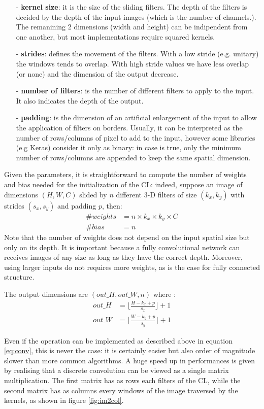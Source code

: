 \documentclass[12pt,a4paper]{report}
\begin{document}
\begin{itemize}
 \setlength\itemsep{-0.2em}
 \item [-] {\bf kernel size}: it is the size of the sliding filters. The depth of the filters is decided by the depth of the input images (which is the number of channels.). The remanining 2 dimensions (width and height) can be indipendent from one another, but most implementations require squared kernels.
 \item [-] {\bf strides}: defines the movement of the filters. With a low stride (e.g. unitary) the windows tends to overlap. With high stride values we have less overlap (or none) and the dimension of the output decrease.
 \item [-] {\bf number of filters}: is the number of different filters to apply to the input. It also indicates the depth of the output.
 \item [-] {\bf padding}: is the dimension of an artificial enlargement of the input to allow the application of filters on borders. Usually, it can be interpreted as the number of rows/columns of pixel to add to the input, however some libraries (e.g Keras) consider it only as binary: in case is true, only the minimum number of rows/columns are appended to keep the same spatial dimension.
\end{itemize}
Given the parameters, it is straightforward to compute the number of weights and bias needed for the initialization of the CL: indeed, suppose an image of dimensions $(H, W, C)$ slided by $n$ different 3-D filters of size $(k_x, k_y)$ with strides $(s_x, s_y)$ and padding $p$, then:
\begin{align}
 \# weights &= n \times k_x \times k_y \times C \\
 \# bias &= n
\end{align}
Note that the number of weights does not depend on the input spatial size but only on its depth. It is important because a fully convolutional network can receives images of any size as long as they have the correct depth. Moreover, using larger inputs do not requires more weights, as is the case for fully connected structure. 

The output dimensions are $(out\_H, out\_W, n)$ where :
\begin{align}
 out\_H &= \lfloor\frac{H - k_x + p}{s_x}\rfloor + 1 \\
 out\_W &= \lfloor\frac{W - k_y + p}{s_y}\rfloor + 1
\end{align}

Even if the operation can be implemented as described above in equation \ref{eq:conv}, this is never the case: it is certainly easier but also order of magnitude slower than more common algorithms.
A huge speed up in performances is given by realising that a discrete convolution can be viewed as a single matrix multiplication. The first matrix has as rows each filters of the CL, while the second matrix has as columns every windows of the image traversed by the kernels, as shown in figure \ref{fig:im2col}.
\end{document}
